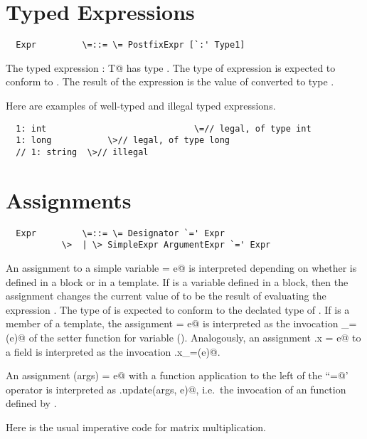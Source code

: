 \documentclass[11pt]{report}
\begin{document}
\section{Typed Expressions}

\syntax\begin{verbatim}
  Expr	       \=::= \= PostfixExpr [`:' Type1]
\end{verbatim}

The typed expression \verb@e: T@ has type \verb@T@. The type of
expression \verb@e@ is expected to conform to \verb@T@. The result of
the expression is the value of \verb@e@ converted to type \verb@T@.

\example Here are examples of well-typed and illegal typed expressions.

\begin{verbatim}
  1: int                             \=// legal, of type int
  1: long	    	\>// legal, of type long
  // 1: string 	\>// illegal
\end{verbatim}

\section{Assignments}

\syntax\begin{verbatim}
  Expr	       \=::= \= Designator `=' Expr
	       \>  | \> SimpleExpr ArgumentExpr `=' Expr
\end{verbatim}

An assignment to a simple variable \verb@x = e@ is interpreted
depending on whether \verb@x@ is defined in a block or in a
template. If \verb@x@ is a variable defined in a block, then the
assignment changes the current value of \verb@x@ to be the result of
evaluating the expression \verb@e@. The type of \verb@e@ is expected
to conform to the declated type of \verb@x@.  If \verb@x@ is a member
of a template, the assignment \verb@x = e@ is interpreted as the
invocation \verb@x_=(e)@ of the setter function for variable \verb@x@
().  Analogously, an assignment \verb@f.x = e@ to a
field \verb@x@ is interpreted as the invocation \verb@f.x_=(e)@.

An assignment \verb@f(args) = e@ with a function application to the
left of the ``\verb@=@' operator is interpreted as 
\verb@f.update(args, e)@, i.e.\
the invocation of an \verb@update@ function defined by \verb@f@.

\example \label{ex:imp-mat-mul}
Here is the usual imperative code for matrix multiplication.
\end{document}
